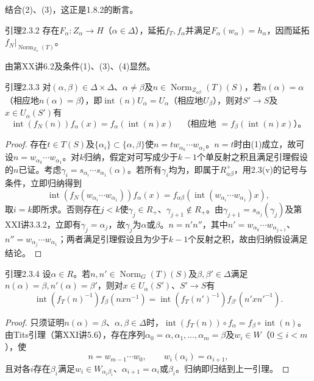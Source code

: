 结合(2)、(3)，这正是1.8.2的断言。
\begin{SGAresult}{引理}{2.3.2}
存在$F_\alpha:Z_\alpha\to H$（$\alpha\in\Delta$），延拓$f_T,f_\alpha$并满足$F_\alpha(w_\alpha)=h_\alpha$，因而延拓$f_N|_{\operatorname{Norm}_{Z_\alpha}(T)}$。
\end{SGAresult}
由第XX讲6.2及条件(1)、(3)、(4)显然。
\begin{SGAresult}{引理}{2.3.3}
对$(\alpha,\beta)\in\Delta\times\Delta$、$\alpha\ne\beta$及$n\in\operatorname{Norm}_{Z_{\alpha\beta}}(T)(S)$，若$n(\alpha)=\alpha$（相应地$n(\alpha)=\beta$），即$\operatorname{int}(n)U_\alpha=U_\alpha$（相应地$U_\beta$），则对$S'\to S$及$x\in U_\alpha(S')$有
\[\operatorname{int}(f_N(n))f_\alpha(x)=f_\alpha(\operatorname{int}(n)x)\quad\text{（相应地 }=f_\beta(\operatorname{int}(n)x)\text{）。}\]
\end{SGAresult}
\begin{proof}
存在$t\in T(S)$及$\{\alpha_i\}\subset\{\alpha,\beta\}$使$n=tw_{\alpha_k}\cdots w_{\alpha_1}$。$n=t$时由(1)成立，故可设$n=w_{\alpha_k}\cdots w_{\alpha_1}$。对$k$归纳，假定对可写成少于$k-1$个单反射之积且满足引理假设的$n$已证。考虑$\gamma_i=s_{\alpha_i}\cdots s_{\alpha_1}(\alpha)$。若所有$\gamma_i$均为，即属于$R^+_{\alpha\beta}$，用2.3(v)的记号与条件，立即归纳得到
\[\operatorname{int}(f_N(w_{\alpha_i}\cdots w_{\alpha_1}))f_\alpha(x)=f_{\alpha\beta}(\operatorname{int}(w_{\alpha_i}\cdots w_{\alpha_1})x),\]
取$i=k$即所求。否则存在$j<k$使$\gamma_j\in R_+$、$\gamma_{j+1}\notin R_+$。由$\gamma_{j+1}=s_{\alpha_j}(\gamma_j)$及第XXI讲3.3.2，立即有$\gamma_j=\alpha_j$，故$\gamma_j$为$\alpha$或$\beta$。$n=n'n''$，其中$n'=w_{\alpha_k}\cdots w_{\alpha_{j+1}}$、$n''=w_{\alpha_j}\cdots w_{\alpha_1}$；两者满足引理假设且为少于$k-1$个反射之积，故由归纳假设满足结论。
\end{proof}
\begin{SGAresult}{引理}{2.3.4}
设$\alpha\in R$。若$n,n'\in\operatorname{Norm}_G(T)(S)$及$\beta,\beta'\in\Delta$满足$n(\alpha)=\beta,n'(\alpha)=\beta'$，则对$x\in U_\alpha(S')$、$S'\to S$有
\[\operatorname{int}(f_T(n)^{-1})f_\beta(nxn^{-1})=\operatorname{int}(f_T(n')^{-1})f_{\beta'}(n'xn'^{-1}).\]
\end{SGAresult}
\begin{proof}
只须证明$n(\alpha)=\beta$、$\alpha,\beta\in\Delta$时，$\operatorname{int}(f_T(n))\circ f_\alpha=f_\beta\circ\operatorname{int}(n)$。由Tits引理（第XXI讲5.6），存在序列$\alpha_0=\alpha,\alpha_1,\ldots,\alpha_m=\beta$及$w_i\in W$（$0\leq i<m$），使
\[n=w_{m-1}\cdots w_0,\qquad w_i(\alpha_i)=\alpha_{i+1},\]
且对各$i$存在$\beta_i$满足$w_i\in W_{\alpha_i\beta_i}$、$\alpha_{i+1}=\alpha_i$或$\beta_i$。归纳即归结到上一引理。
\end{proof}
